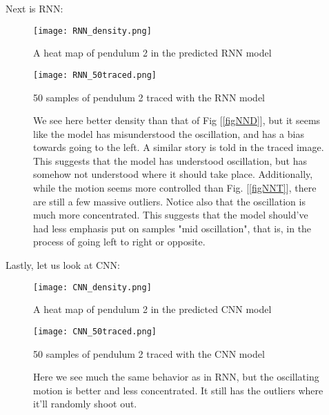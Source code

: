 \documentclass{article}
\begin{document}
\newpage
Next is RNN:
\begin{figure}[ht!]
    \centering
    
    \begin{minipage}{0.48\textwidth}
        \centering
        \texttt{[image: RNN\_density.png]}
        \caption{A heat map of pendulum 2 in the predicted RNN model}
        \label{figRNND}
    \end{minipage}\hfill
    \begin{minipage}{0.48\textwidth}
        \centering
        \texttt{[image: RNN\_50traced.png]}
        \caption{50 samples of pendulum 2 traced with the RNN model}
        \label{figRNNT}
    \end{minipage}
    \caption{We see here better density than that of Fig [\ref{figNND}], but it seems like the model has misunderstood the oscillation, and has a bias towards going to the left. A similar story is told in the traced image. This suggests that the model has understood oscillation, but has somehow not understood where it should take place. Additionally, while the motion seems more controlled than Fig. [\ref{figNNT}], there are still a few massive outliers. \newline
    Notice also that the oscillation is much more concentrated. This suggests that the model should've had less emphasis put on samples "mid oscillation", that is, in the process of going left to right or opposite.}
    \label{figRNN}
\end{figure}
\newline
Lastly, let us look at CNN:
\begin{figure}[ht!]
    \centering
    
    \begin{minipage}{0.48\textwidth}
        \centering
        \texttt{[image: CNN\_density.png]}
        \caption{A heat map of pendulum 2 in the predicted CNN model}
        \label{figRNND}
    \end{minipage}\hfill
    \begin{minipage}{0.48\textwidth}
        \centering
        \texttt{[image: CNN\_50traced.png]}
        \caption{50 samples of pendulum 2 traced with the CNN model}
        \label{figRNNT}
    \end{minipage}
    \caption{Here we see much the same behavior as in RNN, but the oscillating motion is better and less concentrated. It still has the outliers where it'll randomly shoot out.}
    \label{figCNN}
\end{figure}
\end{document}
